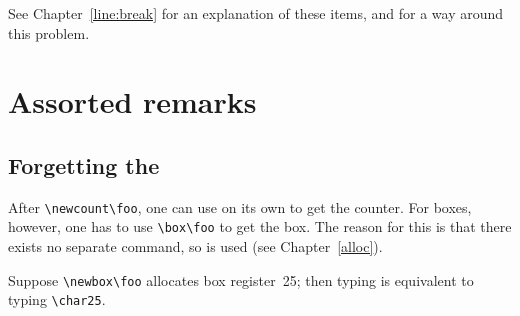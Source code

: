 \documentclass{book}
\begin{document}
See Chapter~\ref{line:break} for an explanation of these
items, and \cite{Downs} for a way around this problem.

\section{Assorted remarks}

\subsection{Forgetting the }

After \verb.\newcount\foo., one can use  on its own
to get the  counter.
For  boxes, however, one has to use \verb.\box\foo. to get
the  box.
The reason for this is that there exists
no separate  command, so  is
used (see Chapter~\ref{alloc}).

\begin{example}
Suppose \verb.\newbox\foo. allocates box register~25; then
typing  is equivalent  to typing
\verb.\char25..
\end{example}

\end{document}
